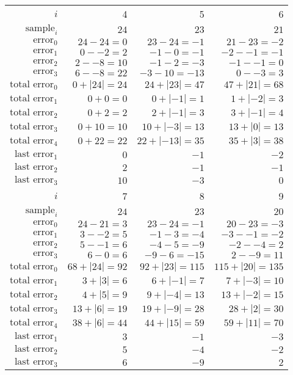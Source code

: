 \begin{table}[h]
\begin{tabular}{r|r|r|r}
\hline
\hline
$i$ & 4 & 5 & 6 \\
$\text{sample}_i$ & $24$ & $23$ & $21$ \\
\hline
$\text{error}_0$ & $24 - 24 = 0$ & $23 - 24 = -1$ & $21 - 23 = -2$ \\
$\text{error}_1$ & $0 - -2 = 2$ & $-1 - 0 = -1$ & $-2 - -1 = -1$ \\
$\text{error}_2$ & $2 - -8 = 10$ & $-1 - 2 = -3$ & $-1 - -1 = 0$ \\
$\text{error}_3$ & $6 - -8 = 22$ & $-3 - 10 = -13$ & $0 - -3 = 3$ \\
\hline
$\text{total error}_0$ & $0 + |24| = 24$ & $24 + |23| = 47$ & $47 + |21| = 68$ \\
$\text{total error}_1$ & $0 + 0 = 0$ & $0 + |-1| = 1$ & $1 + |-2| = 3$ \\
$\text{total error}_2$ & $0 + 2 = 2$ & $2 + |-1| = 3$ & $3 + |-1| = 4$ \\
$\text{total error}_3$ & $0 + 10 = 10$ & $10 + |-3| = 13$ & $13 + |0| = 13$ \\
$\text{total error}_4$ & $0 + 22 = 22$ & $22 + |-13| = 35$ & $35 + |3| = 38$ \\
\hline
$\text{last error}_1$ & $0$ & $-1$ & $-2$ \\
$\text{last error}_2$ & $2$ & $-1$ & $-1$ \\
$\text{last error}_3$ & $10$ & $-3$ & $0$ \\
\hline
\hline
$i$ & 7 & 8 & 9 \\
$\text{sample}_i$ & $24$ & $23$ & $20$ \\
\hline
$\text{error}_0$ & $24 - 21 = 3$ & $23 - 24 = -1$ & $20 - 23 = -3$ \\
$\text{error}_1$ & $3 - -2 = 5$ & $-1 - 3 = -4$ & $-3 - -1 = -2$ \\
$\text{error}_2$ & $5 - -1 = 6$ & $-4 - 5 = -9$ & $-2 - -4 = 2$ \\
$\text{error}_3$ & $6 - 0 = 6$ & $-9 - 6 = -15$ & $2 - -9 = 11$ \\
\hline
$\text{total error}_0$ & $68 + |24| = 92$ & $92 + |23| = 115$ & $115 + |20| = 135$ \\
$\text{total error}_1$ & $3 + |3| = 6$ & $6 + |-1| = 7$ & $7 + |-3| = 10$ \\
$\text{total error}_2$ & $4 + |5| = 9$ & $9 + |-4| = 13$ & $13 + |-2| = 15$ \\
$\text{total error}_3$ & $13 + |6| = 19$ & $19 + |-9| = 28$ & $28 + |2| = 30$ \\
$\text{total error}_4$ & $38 + |6| = 44$ & $44 + |15| = 59$ & $59 + |11| = 70$ \\
\hline
$\text{last error}_1$ & $3$ & $-1$ & $-3$ \\
$\text{last error}_2$ & $5$ & $-4$ & $-2$ \\
$\text{last error}_3$ & $6$ & $-9$ & $2$ \\
\hline
\hline
\end{tabular}
\end{table}
